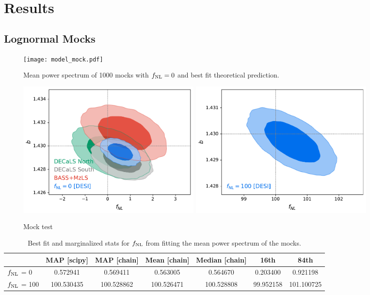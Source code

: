 \section{Results}\label{sec:results}


\subsection{Lognormal Mocks}

\begin{figure}
\centering
\texttt{[image: model\_mock.pdf]}
\caption{Mean power spectrum of 1000 mocks with $f_{\rm NL}=0$ and best fit theoretical prediction.}
\end{figure}

\begin{figure}
    \centering
    \includegraphics[width=0.45\textwidth]{figures/mcmc_zero.pdf} 
    \includegraphics[width=0.45\textwidth]{figures/mcmc_po100.pdf} 
    \caption{Mock test}\label{fig:mcmc_mocks}
\end{figure}


\begin{table}
  \begin{center}
    \caption{Best fit and marginalized stats for $f_{\rm NL}$ from fitting the mean power spectrum of the mocks.}
    \label{tab:mocksmcmc}
    \begin{tabular}{lcccccc}
    \hline
    \hline
    & MAP [scipy] & MAP [chain]  &	Mean [chain]	& Median [chain] &	16th	& 84th \\
    \hline
    $f_{\rm NL}$ = 0	& 0.572941	& 0.569411 &	0.563005&	0.564670&	0.203400&	0.921198 \\
    $f_{\rm NL}$ = 100	& 100.530435	& 100.528862 &	100.526471&	100.528808&	99.952158&	101.100725
    \end{tabular}
  \end{center}
\end{table}


